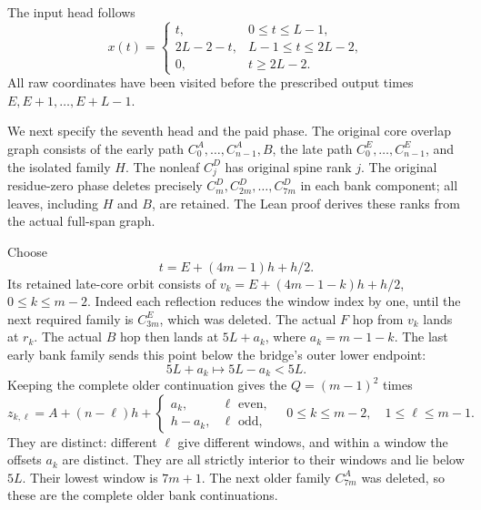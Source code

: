 \begin{outline}
The input head follows
\begin{equation}
 x(t)=
 \begin{cases}
 t,&0\le t\le L-1,\\
 2L-2-t,&L-1\le t\le2L-2,\\
 0,&t\ge2L-2.
 \end{cases}
 \label{eq:serial-raw-walk}
\end{equation}
All raw coordinates have been visited before the prescribed output
times $E,E+1,\ldots,E+L-1$.

We next specify the seventh head and the paid phase.  The original
core overlap graph consists of the early path
$C_0^A,\ldots,C_{n-1}^A,B$, the late path
$C_0^E,\ldots,C_{n-1}^E$, and the isolated family $H$.
The nonleaf $C_j^D$ has original spine rank $j$.
The original residue-zero phase deletes precisely
$C_m^D,C_{2m}^D,\ldots,C_{7m}^D$ in each bank component;
all leaves, including $H$ and $B$, are retained.
The Lean proof derives these ranks from the actual full-span graph.

Choose
\[
 t=E+(4m-1)h+h/2.
\]
Its retained late-core orbit consists of
$v_k=E+(4m-1-k)h+h/2$, $0\le k\le m-2$.
Indeed each reflection reduces the window index by one, until the
next required family is $C_{3m}^E$, which was deleted.  The actual
$F$ hop from $v_k$ lands at $r_k$.  The actual $B$ hop then lands at
$5L+a_k$, where $a_k=m-1-k$.  The last early bank family sends this
point below the bridge's outer lower endpoint:
\[
 5L+a_k\longmapsto5L-a_k<5L.
\]
Keeping the complete older continuation gives the $Q=(m-1)^2$ times
\begin{equation}
 z_{k,\ell}=A+(n-\ell)h+
 \begin{cases}
 a_k,&\ell\text{ even},\\
 h-a_k,&\ell\text{ odd},
 \end{cases}
 \quad 0\le k\le m-2,\quad1\le\ell\le m-1.
 \label{eq:serial-older-grid}
\end{equation}
They are distinct: different $\ell$ give different windows, and within
a window the offsets $a_k$ are distinct.  They are all strictly
interior to their windows and lie below $5L$.  Their lowest window is
$7m+1$.  The next older family $C_{7m}^A$ was deleted, so
these are the complete older bank continuations.


\end{outline}
